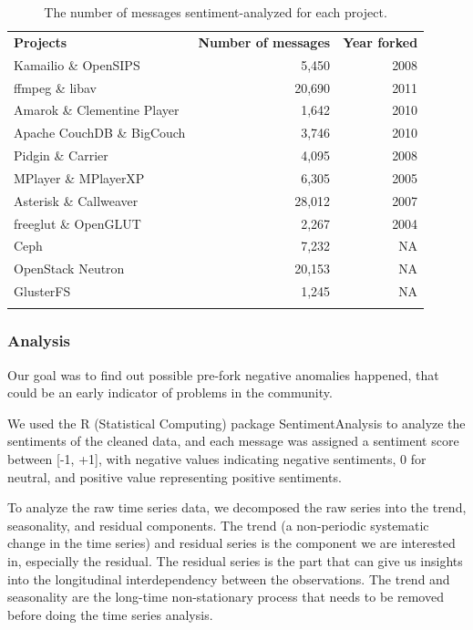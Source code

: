 \documentclass[12pt,letterpaper]{gthesis2}  %
\begin{document}
\begin{table}
\centering
\caption{The number of messages sentiment-analyzed for each project.}
\label{TS_NumberOfMessages}
\begin{tabular}{p{} r r}
\hline\noalign{\smallskip}
\textbf{Projects} & \textbf{Number of messages} & \textbf{Year forked}\\
\noalign{\smallskip}\hline\noalign{\smallskip}
Kamailio \& OpenSIPS & 5,450  & 2008 \\ \hline
ffmpeg \& libav &  20,690 & 2011 \\ \hline
Amarok \& Clementine Player & 1,642  & 2010 \\ \hline
Apache CouchDB \& BigCouch &  3,746  & 2010 \\ \hline
Pidgin \& Carrier &  4,095  & 2008 \\ \hline
MPlayer \& MPlayerXP &   6,305  & 2005 \\ \hline
Asterisk \& Callweaver & 28,012  & 2007 \\ \hline
freeglut \& OpenGLUT & 2,267  & 2004 \\ \hline
Ceph  &  7,232  & NA \\ \hline
OpenStack Neutron &  20,153   & NA \\ \hline
GlusterFS &   1,245  & NA \\ 
\noalign{\smallskip}\hline
\end{tabular}
\end{table}



\subsubsection{Analysis}

Our goal was to find out possible pre-fork negative anomalies happened, that could be an early indicator of problems in the community. 

We used the R (Statistical Computing) \cite{R} package SentimentAnalysis \cite{Feuer}\cite{Proel} to analyze the sentiments of the cleaned data, and each message was assigned a sentiment score between [-1, +1], with negative values indicating negative sentiments, 0 for neutral, and positive value representing positive sentiments. 

To analyze the raw time series data, we decomposed the raw series into the trend, seasonality, and residual components. The trend (a non-periodic systematic change in the time series) and residual series is the component we are interested in, especially the residual. The residual series is the part that can give us insights into the longitudinal interdependency between the observations. The trend and seasonality are the long-time non-stationary process that needs to be removed before doing the time series analysis.
\end{document}
